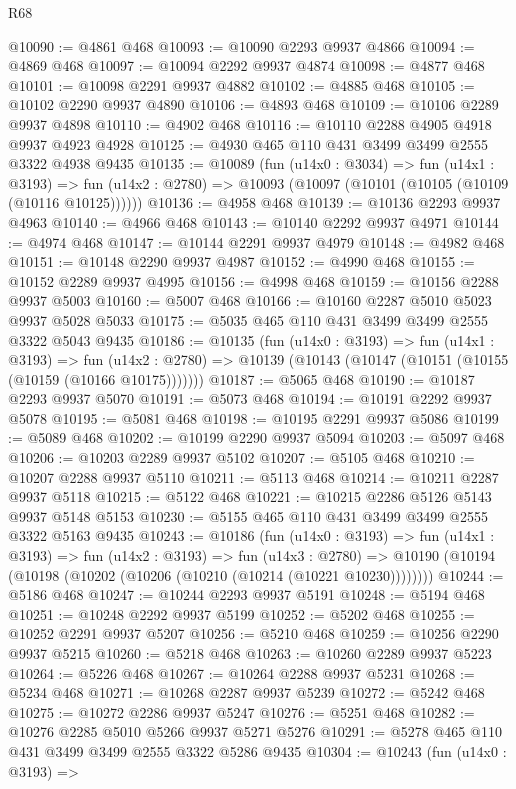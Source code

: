 \begin{lexlean}{R68}
\begin{coremodule}
@10090 := @4861 @468
@10093 := @10090 @2293 @9937 @4866
@10094 := @4869 @468
@10097 := @10094 @2292 @9937 @4874
@10098 := @4877 @468
@10101 := @10098 @2291 @9937 @4882
@10102 := @4885 @468
@10105 := @10102 @2290 @9937 @4890
@10106 := @4893 @468
@10109 := @10106 @2289 @9937 @4898
@10110 := @4902 @468
@10116 := @10110 @2288 @4905 @4918 @9937 @4923 @4928
@10125 := @4930 @465 @110 @431 @3499 @3499 @2555 @3322 @4938 @9435
@10135 := @10089
    (fun (u14x0 : @3034) =>
    fun (u14x1 : @3193) =>
    fun (u14x2 : @2780) => @10093 (@10097 (@10101 (@10105 (@10109 (@10116 @10125))))))
@10136 := @4958 @468
@10139 := @10136 @2293 @9937 @4963
@10140 := @4966 @468
@10143 := @10140 @2292 @9937 @4971
@10144 := @4974 @468
@10147 := @10144 @2291 @9937 @4979
@10148 := @4982 @468
@10151 := @10148 @2290 @9937 @4987
@10152 := @4990 @468
@10155 := @10152 @2289 @9937 @4995
@10156 := @4998 @468
@10159 := @10156 @2288 @9937 @5003
@10160 := @5007 @468
@10166 := @10160 @2287 @5010 @5023 @9937 @5028 @5033
@10175 := @5035 @465 @110 @431 @3499 @3499 @2555 @3322 @5043 @9435
@10186 := @10135
    (fun (u14x0 : @3193) =>
    fun (u14x1 : @3193) =>
    fun (u14x2 : @2780) => @10139 (@10143 (@10147 (@10151 (@10155 (@10159 (@10166 @10175)))))))
@10187 := @5065 @468
@10190 := @10187 @2293 @9937 @5070
@10191 := @5073 @468
@10194 := @10191 @2292 @9937 @5078
@10195 := @5081 @468
@10198 := @10195 @2291 @9937 @5086
@10199 := @5089 @468
@10202 := @10199 @2290 @9937 @5094
@10203 := @5097 @468
@10206 := @10203 @2289 @9937 @5102
@10207 := @5105 @468
@10210 := @10207 @2288 @9937 @5110
@10211 := @5113 @468
@10214 := @10211 @2287 @9937 @5118
@10215 := @5122 @468
@10221 := @10215 @2286 @5126 @5143 @9937 @5148 @5153
@10230 := @5155 @465 @110 @431 @3499 @3499 @2555 @3322 @5163 @9435
@10243 := @10186
    (fun (u14x0 : @3193) =>
    fun (u14x1 : @3193) =>
    fun (u14x2 : @3193) =>
    fun (u14x3 : @2780) =>
    @10190 (@10194 (@10198 (@10202 (@10206 (@10210 (@10214 (@10221 @10230))))))))
@10244 := @5186 @468
@10247 := @10244 @2293 @9937 @5191
@10248 := @5194 @468
@10251 := @10248 @2292 @9937 @5199
@10252 := @5202 @468
@10255 := @10252 @2291 @9937 @5207
@10256 := @5210 @468
@10259 := @10256 @2290 @9937 @5215
@10260 := @5218 @468
@10263 := @10260 @2289 @9937 @5223
@10264 := @5226 @468
@10267 := @10264 @2288 @9937 @5231
@10268 := @5234 @468
@10271 := @10268 @2287 @9937 @5239
@10272 := @5242 @468
@10275 := @10272 @2286 @9937 @5247
@10276 := @5251 @468
@10282 := @10276 @2285 @5010 @5266 @9937 @5271 @5276
@10291 := @5278 @465 @110 @431 @3499 @3499 @2555 @3322 @5286 @9435
@10304 := @10243
    (fun (u14x0 : @3193) =>

\end{coremodule}
\end{lexlean}
